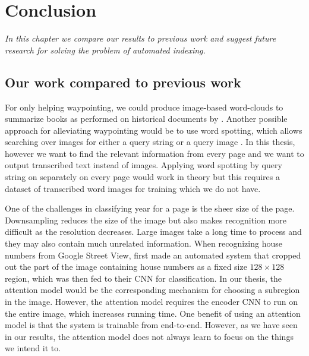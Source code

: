 \chapter{Conclusion}

\textit{In this chapter we compare our results to previous work and suggest future research for solving the problem of automated indexing.}

%
%


\section{Our work compared to previous work}

For only helping waypointing, we could produce image-based word-clouds to summarize books as performed on historical documents by \textcite{ImageCloud}. Another possible approach for alleviating waypointing would be to use word spotting, which allows searching over images for either a query string or a query image \cite{WordSpotting}.
In this thesis, however we want to find the relevant information from every page and we want to output transcribed text instead of images. Applying word spotting by query string on separately on every page would work in theory but this requires a dataset of transcribed word images for training which we do not have.

One of the challenges in classifying year for a page is the sheer size of the page. Downsampling reduces the size of the image but also makes recognition more difficult as the resolution decreases. Large images take a long time to process and they may also contain much unrelated information. When recognizing house numbers from Google Street View, \textcite{multidigit_streetview} first made an automated system that cropped out the part of the image containing house numbers as a fixed size $128 \times 128$ region, which was then fed to their CNN for classification. In our thesis, the attention model would be the corresponding mechanism for choosing a subregion in the image. However, the attention model requires the encoder CNN to run on the entire image, which increases running time.
One benefit of using an attention model is that the system is trainable from end-to-end.
However, as we have seen in our results, the attention model does not always learn to focus on the things we intend it to.

